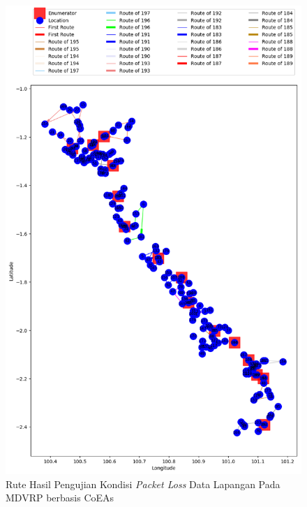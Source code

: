 \begin{figure}[H]
	\centering
	\includegraphics[width=\textwidth]{Resources/Images/test_result_normal_field_m15_n182_packet_loss_coes}
	\caption{Rute Hasil Pengujian Kondisi \textit{Packet Loss} Data Lapangan Pada MDVRP berbasis CoEAs}
	\label{fig:test_result_packet_loss_field_coes}
\end{figure}


